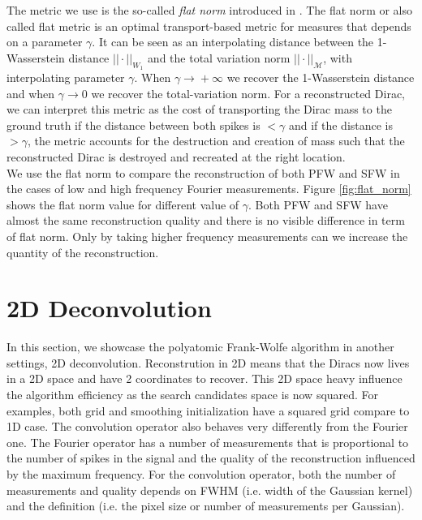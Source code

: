 \documentclass[a4paper,12pt,oneside]{report}
\theoremstyle{named}
\begin{document}
The metric we use is the so-called \textit{flat norm} introduced in \cite{denoyelle2021optimaltransportbasedmetricsmlm}. The flat norm or also called flat metric is an optimal transport-based metric for measures that depends on a parameter $\gamma$. It can be seen as an interpolating distance between the 1-Wasserstein distance $||\cdot||_{W_1}$ \cite{ramdas2015wassersteinsampletestingrelated} and the total variation norm $||\cdot||_{\mathcal{M}}$, with interpolating parameter $\gamma$. When $\gamma \xrightarrow{} + \infty$ we recover the 1-Wasserstein distance and when $\gamma \xrightarrow{} 0$ we recover the total-variation norm. For a reconstructed Dirac, we can interpret this metric as the cost of transporting the Dirac mass to the ground truth if the distance between both spikes is $< \gamma$ and if the distance is $> \gamma$, the metric accounts for the destruction and creation of mass such that the reconstructed Dirac is destroyed and recreated at the right location. \\


We use the flat norm to compare the reconstruction of both PFW and SFW in the cases of low and high frequency Fourier measurements. Figure \ref{fig:flat_norm} shows the flat norm value for different value of $\gamma$. Both PFW and SFW have almost the same reconstruction quality and there is no visible difference in term of flat norm. Only by taking higher frequency measurements can we increase the quantity of the reconstruction. 

\section{2D Deconvolution}
In this section, we showcase the polyatomic Frank-Wolfe algorithm in another settings, 2D deconvolution. Reconstrution in 2D means that the Diracs now lives in a 2D space and have 2 coordinates to recover. This 2D space heavy influence the algorithm efficiency as the search candidates space is now squared. For examples, both grid and smoothing initialization have a squared grid compare to 1D case. The convolution operator also behaves very differently from the Fourier one. The Fourier operator has a number of measurements that is proportional to the number of spikes in the signal and the quality of the reconstruction influenced by the maximum frequency. For the convolution operator, both the number of measurements and quality depends on FWHM (i.e. width of the Gaussian kernel) and the definition (i.e. the pixel size or number of measurements per Gaussian).
\end{document}
